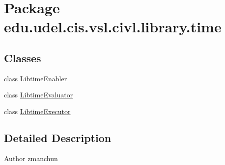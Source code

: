 \hypertarget{namespaceedu_1_1udel_1_1cis_1_1vsl_1_1civl_1_1library_1_1time}{}\section{Package edu.\+udel.\+cis.\+vsl.\+civl.\+library.\+time}
\label{namespaceedu_1_1udel_1_1cis_1_1vsl_1_1civl_1_1library_1_1time}
\subsection*{Classes}
\begin{DoxyCompactItemize}
\item 
class \hyperlink{classedu_1_1udel_1_1cis_1_1vsl_1_1civl_1_1library_1_1time_1_1LibtimeEnabler}{Libtime\+Enabler}
\item 
class \hyperlink{classedu_1_1udel_1_1cis_1_1vsl_1_1civl_1_1library_1_1time_1_1LibtimeEvaluator}{Libtime\+Evaluator}
\item 
class \hyperlink{classedu_1_1udel_1_1cis_1_1vsl_1_1civl_1_1library_1_1time_1_1LibtimeExecutor}{Libtime\+Executor}
\end{DoxyCompactItemize}


\subsection{Detailed Description}
\begin{DoxyAuthor}{Author}
zmanchun 
\end{DoxyAuthor}
